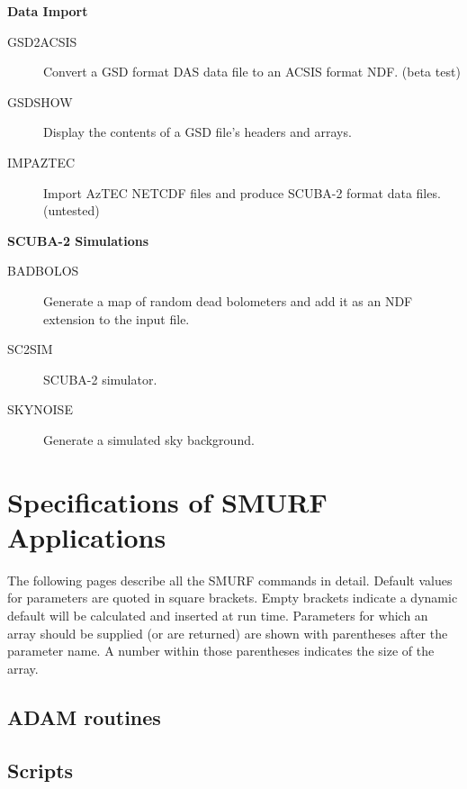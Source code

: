 \documentclass[twoside,11pt]{article}
\newcommand{\htmlref}[2]{#1}
\newcommand{\xlabel}[1]{}
\renewcommand{\_}{\texttt{\symbol{95}}}
\newcommand{\classitem}[1]{\item [\htmlref{#1}{#1}]}
\begin{document}
\begin{small}
{\large
\begin{center}
{\bf Data Import}
\end{center}
}

\begin{description}
\classitem{GSD2ACSIS}
 Convert a GSD format DAS data file to an ACSIS format NDF. (beta test)
\classitem{GSDSHOW}
 Display the contents of a GSD file's headers and arrays.
\classitem{IMPAZTEC}
 Import AzTEC NETCDF files and produce SCUBA-2 format data files. (untested)
\end{description}

{\large
\begin{center}
{\bf SCUBA-2 Simulations}
\end{center}
}

\begin{description}
\classitem{BADBOLOS}
 Generate a map of random dead bolometers and add it as an NDF extension to the input file.
\classitem{SC2SIM}
SCUBA-2 simulator.
\classitem{SKYNOISE}
 Generate a simulated sky background.
\end{description}

\end{small}

\section{\xlabel{ap_full}Specifications of SMURF Applications\label{ap:full}}

The following pages describe all the SMURF commands in detail. Default
values for parameters are quoted in square brackets. Empty brackets
indicate a dynamic default will be calculated and inserted at run
time. Parameters for which an array should be supplied (or are
returned) are shown with parentheses after the parameter name. A
number within those parentheses indicates the size of the array.

\subsection{ADAM routines}


\clearpage
\subsection{Scripts}

\end{document}
